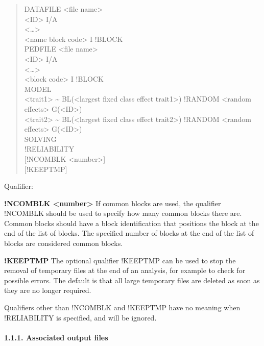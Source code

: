 \begin{quote}
DATAFILE \textless file name\textgreater{}\\
\textless ID\textgreater{} I/A\\
\textless\ldots\textgreater{}\\
\textless name block code\textgreater{} I !BLOCK\\
PEDFILE \textless file name\textgreater{}\\
\textless ID\textgreater{} I/A\\
\textless\ldots\textgreater{}\\
\textless block code\textgreater{} I !BLOCK\\
MODEL\\
\textless trait1\textgreater{} \textasciitilde{} BL(\textless largest
fixed class effect trait1\textgreater) !RANDOM \textless random
effects\textgreater{} G(\textless ID\textgreater)\\
\textless trait2\textgreater{} \textasciitilde{} BL(\textless largest
fixed class effect trait2\textgreater) !RANDOM \textless random
effects\textgreater{} G(\textless ID\textgreater)\\
SOLVING\\
!RELIABILITY\\
{[}!NCOMBLK \textless number\textgreater{]}\\
{[}!KEEPTMP{]}
\end{quote}

Qualifier:

\textbf{!NCOMBLK \textless number\textgreater{}} If common blocks are
used, the qualifier !NCOMBLK should be used to specify how many common
blocks there are. Common blocks should have a block identification that
positions the block at the end of the list of blocks. The specified
number of blocks at the end of the list of blocks are considered common
blocks.

\textbf{!KEEPTMP} The optional qualifier !KEEPTMP can be used to stop
the removal of temporary files at the end of an analysis, for example to
check for possible errors. The default is that all large temporary files
are deleted as soon as they are no longer required.

Qualifiers other than !NCOMBLK and !KEEPTMP have no meaning when
!RELIABILITY is specified, and will be ignored.

\paragraph{1.1.1. Associated output files}\label{Reli20}

